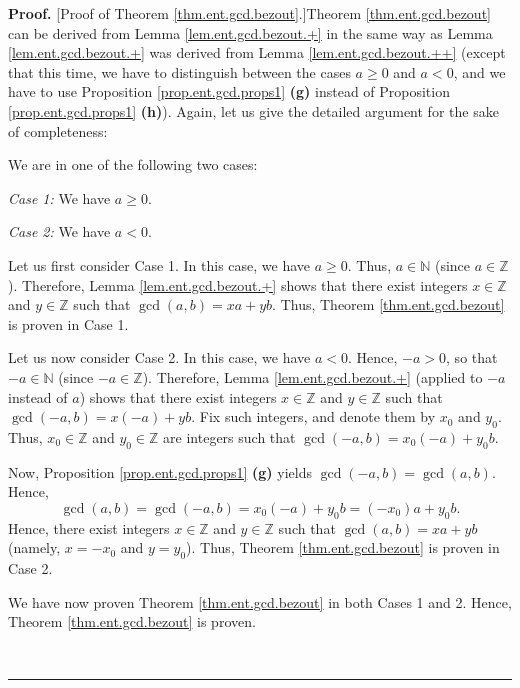 \documentclass[numbers=enddot,12pt,final,onecolumn,notitlepage]{scrartcl}%
\numberwithin{exer}{subsection}
\theoremstyle{definition}
\newenvironment{fineprint}{\begin{small}}{\end{small}}
\newenvironment{proof}[1][Proof]{\noindent\textbf{#1.} }{\ \rule{0.5em}{0.5em}}
\begin{document}
\begin{proof}
[Proof of Theorem \ref{thm.ent.gcd.bezout}.]Theorem \ref{thm.ent.gcd.bezout}
can be derived from Lemma \ref{lem.ent.gcd.bezout.+} in the same way as Lemma
\ref{lem.ent.gcd.bezout.+} was derived from Lemma \ref{lem.ent.gcd.bezout.++}
(except that this time, we have to distinguish between the cases $a\geq0$ and
$a<0$, and we have to use Proposition \ref{prop.ent.gcd.props1} \textbf{(g)}
instead of Proposition \ref{prop.ent.gcd.props1} \textbf{(h)}). Again, let us
give the detailed argument for the sake of completeness:

\begin{fineprint}
We are in one of the following two cases:

\textit{Case 1:} We have $a\geq0$.

\textit{Case 2:} We have $a<0$.

Let us first consider Case 1. In this case, we have $a\geq0$. Thus,
$a\in\mathbb{N}$ (since $a\in\mathbb{Z}$). Therefore, Lemma
\ref{lem.ent.gcd.bezout.+} shows that there exist integers $x\in\mathbb{Z}$
and $y\in\mathbb{Z}$ such that $\gcd\left(  a,b\right)  =xa+yb$. Thus, Theorem
\ref{thm.ent.gcd.bezout} is proven in Case 1.

Let us now consider Case 2. In this case, we have $a<0$. Hence, $-a>0$, so
that $-a\in\mathbb{N}$ (since $-a\in\mathbb{Z}$). Therefore, Lemma
\ref{lem.ent.gcd.bezout.+} (applied to $-a$ instead of $a$) shows that there
exist integers $x\in\mathbb{Z}$ and $y\in\mathbb{Z}$ such that $\gcd\left(
-a,b\right)  =x\left(  -a\right)  +yb$. Fix such integers, and denote them by
$x_{0}$ and $y_{0}$. Thus, $x_{0}\in\mathbb{Z}$ and $y_{0}\in\mathbb{Z}$ are
integers such that $\gcd\left(  -a,b\right)  =x_{0}\left(  -a\right)  +y_{0}b$.

Now, Proposition \ref{prop.ent.gcd.props1} \textbf{(g)} yields $\gcd\left(
-a,b\right)  =\gcd\left(  a,b\right)  $. Hence,%
\[
\gcd\left(  a,b\right)  =\gcd\left(  -a,b\right)  =x_{0}\left(  -a\right)
+y_{0}b=\left(  -x_{0}\right)  a+y_{0}b.
\]
Hence, there exist integers $x\in\mathbb{Z}$ and $y\in\mathbb{Z}$ such that
$\gcd\left(  a,b\right)  =xa+yb$ (namely, $x=-x_{0}$ and $y=y_{0}$). Thus,
Theorem \ref{thm.ent.gcd.bezout} is proven in Case 2.

We have now proven Theorem \ref{thm.ent.gcd.bezout} in both Cases 1 and 2.
Hence, Theorem \ref{thm.ent.gcd.bezout} is proven.
\end{fineprint}
\end{proof}
\end{document}

